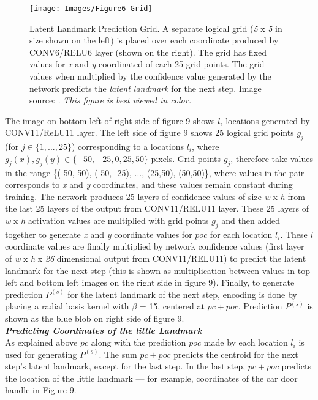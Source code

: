\documentclass [11pt,letterpaper ,twoside ,openany ]{report}
\begin{document}
    \begin{figure}[t]
      \centering
      \texttt{[image: Images/Figure6-Grid]}
      \caption{Latent Landmark Prediction Grid. A separate logical grid (\textit{5} x \textit{5} in size shown on the left) is placed over each coordinate produced by CONV6/RELU6 layer (shown on the right). The grid has fixed values for \textit{x} and \textit{y} coordinated of each 25 grid points. The grid values when multiplied by the confidence value generated by the network predicts the \textit{latent landmark} for the next step. Image source: \cite{Singh_2016_CVPR}. \textit{This figure is best viewed in color.}}
      \label{fig:grid}
    \end{figure}

    The image on bottom left of right side of figure 9 shows \(l_i\) locations generated by CONV11/ReLU11 layer. The left side of figure 9 shows 25 logical grid points \(g_j\) (for \(j \in \{ 1,...,25 \} \)) corresponding to a locations \(l_i\), where \(g_j(x), g_j(y) \in \{-50, -25, 0, 25, 50\} \) pixels. Grid points \(g_j\), therefore take values in the range \{(-50,-50), (-50, -25), ..., (25,50), (50,50)\}, where values in the pair corresponds to \textit{x} and \textit{y} coordinates, and these values remain constant during training. The network produces 25 layers of confidence values of size \textit {w} x \textit {h} from the last 25 layers of the output from CONV11/RELU11 layer. These 25 layers of \textit {w} x \textit {h} activation values are multiplied with grid points \(g_j\) and then added together to generate \textit{x} and \textit{y} coordinate values for \( poc \) for each location \(l_i\). These \(i\) coordinate values are finally multiplied by network confidence values (first layer of \textit {w} x \textit {h} x \textit {26} dimensional output from CONV11/RELU11) to predict the latent landmark for the next step (this is shown as multiplication between values in top left and bottom left images on the right side in figure 9).  Finally, to generate prediction \(P^{(s)} \) for the latent landmark of the next step, encoding is done by placing a radial basis kernel with \(\beta \) = 15, centered at \( pc + poc \). Prediction \(P^{(s)} \) is shown as the blue blob on right side of figure 9.\\

    \noindent
    \textbf{\textit{Predicting Coordinates of the little Landmark}}\\
    As explained above \(pc \) along with the prediction \(poc\) made by each location \(l_i\) is used for generating \(P^{(s)}\). The sum \(pc + poc\) predicts the centroid for the next step's latent landmark, except for the last step. In the last step, \(pc + poc\) predicts the location of the little landmark --- for example, coordinates of the car door handle in Figure 9.\\\\
\end{document}
